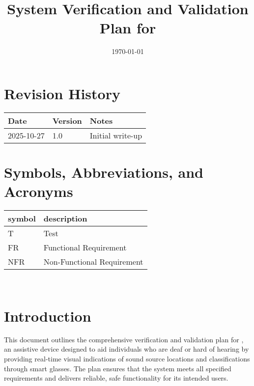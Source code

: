\documentclass[12pt, titlepage]{article}
\begin{document}
\title{System Verification and Validation Plan for \progname{}} 
\author{\authname}
\date{\today}
	
\maketitle




\section*{Revision History}

\begin{tabularx}{\textwidth}{|p{3cm}|p{2cm}|X|}
\hline
{\bf Date} & {\bf Version} & {\bf Notes}\\
\hline
2025-10-27 & 1.0 & Initial write-up\\
\hline
\end{tabularx}

\newpage

\tableofcontents


\newpage

\section{Symbols, Abbreviations, and Acronyms}

\renewcommand{\arraystretch}{1.2}
\begin{tabular}{|l|l|} 
  \hline	
  \textbf{symbol} & \textbf{description}\\
  \hline
  T & Test\\
  FR & Functional Requirement\\
  NFR & Non-Functional Requirement\\
  \hline
\end{tabular}\\


\newpage


\section{Introduction}

This document outlines the comprehensive verification and validation plan for
\progname{}, an assistive device designed to aid individuals who are deaf or
hard of hearing by providing real-time visual indications of sound source
locations and classifications through smart glasses. The plan ensures that the
system meets all specified requirements and delivers reliable, safe
functionality for its intended users.
\end{document}
